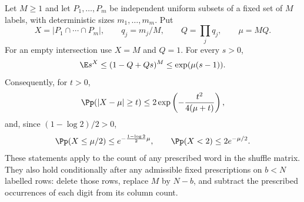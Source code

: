 \begin{lemma}
\label{lem:successive-thinning-tail}
Let \(M\ge1\) and let \(P_1,\ldots,P_m\) be independent uniform
subsets of a fixed set of \(M\) labels, with deterministic sizes
\(m_1,\ldots,m_m\). Put
\[
 X=|P_1\cap\cdots\cap P_m|,\qquad
 q_j=m_j/M,\qquad Q=\prod_jq_j,\qquad \mu=MQ.
\]
For an empty intersection use \(X=M\) and \(Q=1\). For every \(s>0\),
\begin{equation}
\label{eq:thinning-transform}
 \E s^X\le(1-Q+Qs)^M\le \exp(\mu(s-1)).
\end{equation}
Consequently, for \(t>0\),
\begin{equation}
\label{eq:thinning-bernstein}
 \Pp(|X-\mu|\ge t)\le
 2\exp\left(-\frac{t^2}{4(\mu+t)}\right),
\end{equation}
and, since $(1-\log2)/2>0$,
\begin{equation}
\label{eq:thinning-lower-tail}
 \Pp(X\le\mu/2)\le e^{-\frac{1-\log2}{2}\mu},
 \qquad \Pp(X<2)\le2e^{-\mu/2}.
\end{equation}
These statements apply to the count of any prescribed word in the shuffle
matrix. They also hold conditionally after any admissible fixed prescriptions
on \(b<N\) labelled rows: delete those rows, replace \(M\) by \(N-b\),
and subtract the prescribed occurrences of each digit from its column count.
\end{lemma}

